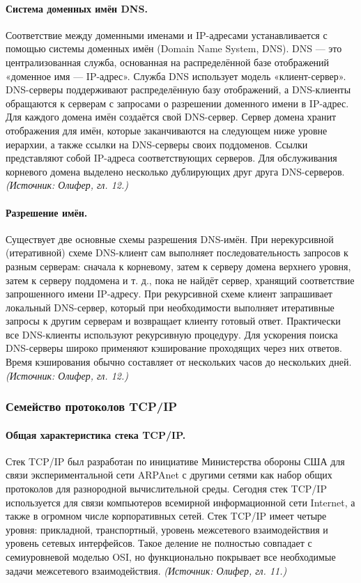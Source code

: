 \documentclass[a4paper,12pt]{article}
\begin{document}
\paragraph{Система доменных имён DNS.}
Соответствие между доменными именами и IP-адресами устанавливается с помощью системы доменных имён (Domain Name System, DNS). DNS — это централизованная служба, основанная на распределённой базе отображений «доменное имя — IP-адрес». Служба DNS использует модель «клиент-сервер». DNS-серверы поддерживают распределённую базу отображений, а DNS-клиенты обращаются к серверам с запросами о разрешении доменного имени в IP-адрес. Для каждого домена имён создаётся свой DNS-сервер. Сервер домена хранит отображения для имён, которые заканчиваются на следующем ниже уровне иерархии, а также ссылки на DNS-серверы своих поддоменов. Ссылки представляют собой IP-адреса соответствующих серверов. Для обслуживания корневого домена выделено несколько дублирующих друг друга DNS-серверов.
\textit{(Источник: Олифер, гл. 12.)}

\paragraph{Разрешение имён.}
Существует две основные схемы разрешения DNS-имён. При нерекурсивной (итеративной) схеме DNS-клиент сам выполняет последовательность запросов к разным серверам: сначала к корневому, затем к серверу домена верхнего уровня, затем к серверу поддомена и т. д., пока не найдёт сервер, хранящий соответствие запрошенного имени IP-адресу. При рекурсивной схеме клиент запрашивает локальный DNS-сервер, который при необходимости выполняет итеративные запросы к другим серверам и возвращает клиенту готовый ответ. Практически все DNS-клиенты используют рекурсивную процедуру. Для ускорения поиска DNS-серверы широко применяют кэширование проходящих через них ответов. Время кэширования обычно составляет от нескольких часов до нескольких дней.
\textit{(Источник: Олифер, гл. 12.)}

\subsubsection{Семейство протоколов TCP/IP}

\paragraph{Общая характеристика стека TCP/IP.}
Стек TCP/IP был разработан по инициативе Министерства обороны США для связи экспериментальной сети ARPAnet с другими сетями как набор общих протоколов для разнородной вычислительной среды. Сегодня стек TCP/IP используется для связи компьютеров всемирной информационной сети Internet, а также в огромном числе корпоративных сетей. Стек TCP/IP имеет четыре уровня: прикладной, транспортный, уровень межсетевого взаимодействия и уровень сетевых интерфейсов. Такое деление не полностью совпадает с семиуровневой моделью OSI, но функционально покрывает все необходимые задачи межсетевого взаимодействия.
\textit{(Источник: Олифер, гл. 11.)}
\end{document}
